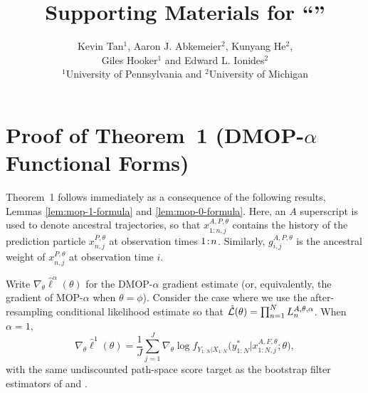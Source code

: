 \documentclass[11pt]{article}
\newcommand\thmMopFunctionalForms{1}
\theoremstyle{thmstylethree}%
\begin{document}
\title{Supporting Materials for ``\articleTitle''}

\author{Kevin Tan$^1$, Aaron J. Abkemeier$^2$, Kunyang He$^2$,\\
Giles Hooker$^1$ and Edward L. Ionides$^2$\\\small $^1$University of Pennsylvania and $^2$University of Michigan}
\date{}

\maketitle

\tableofcontents

\pagebreak

\section{Proof of Theorem~{\thmMopFunctionalForms} (DMOP-$\alpha$ Functional Forms)}


\label{appendix:functional}


Theorem~{\thmMopFunctionalForms} follows immediately as a consequence of the following results, Lemmas \ref{lem:mop-1-formula} and \ref{lem:mop-0-formula}.
Here, an $A$ superscript is used to denote ancestral trajectories, so that $x_{1:n,j}^{A, P,\theta}$ contains the history of the prediction particle $x_{n,j}^{P,\theta}$ at observation times ${1}\!:\!{n}$.
Similarly, $g_{i,j}^{A,P,\theta}$ is the ancestral weight of $x_{n,j}^{P,\theta}$ at observation time $i$.

\begin{lem}
\label{lem:mop-1-formula}
Write $\nabla_\theta \hat\ell^\alpha(\theta)$ for the DMOP-$\alpha$ gradient estimate (or, equivalently, the gradient of MOP-$\alpha$ when $\theta=\phi$).
Consider the case where we use the after-resampling conditional likelihood estimate so that $\hat{\mathcal{L}}(\theta) = \prod_{n=1}^N L_n^{A, \theta, \alpha}$.
When $\alpha=1$,
    \begin{equation}
        \nabla_\theta \hat{\ell}^1(\theta) 
        = \frac{1}{J}\sum_{j=1}^J \nabla_\theta \log f_{Y_{1:N}|X_{1:N}}\big(y_{1:N}^* | x_{1:N,j}^{A, F,\theta};\theta\big),
    \end{equation}
    with the same undiscounted path-space score target as the bootstrap filter estimators of \cite{poyiadjis11} and \cite{scibior21}.
\end{lem}
\end{document}
